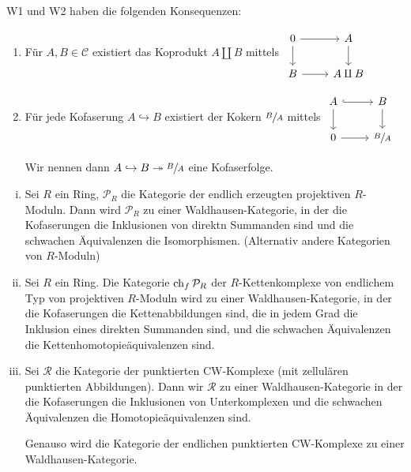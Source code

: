 \begin{bemerkung}
	W1 und W2 haben die folgenden Konsequenzen:
	\begin{enumerate}[1)]
		\item Für $A,B \in \mathcal{C}$ existiert das Koprodukt $A \amalg B$ mittels
		\(
			\begin{tikzcd}
				0 \rar \dar & A \dar \\
				B \rar & A \amalg B
			\end{tikzcd}
		\)
		\item Für jede Kofaserung $A \hookrightarrow B$ existiert der Kokern $\sfrac{B}{A}$ mittels
		\(
			\begin{tikzcd}
				A \rar[hook] \dar & B \dar \\
				0 \rar & \sfrac{B}{A}
			\end{tikzcd}
		\)
		
		Wir nennen dann $A \hookrightarrow B \twoheadrightarrow \sfrac{B}{A}$ eine Kofaserfolge.
	\end{enumerate}
\end{bemerkung}

\begin{beispiel}
	\leavevmode
	\begin{enumerate}[(i)]
		\item Sei $R$ ein Ring, $\mathcal{P}_R$ die Kategorie der endlich erzeugten projektiven $R$-Moduln.
		Dann wird $\mathcal{P}_R$ zu einer Waldhausen-Kategorie, in der die Kofaserungen die Inklusionen von direktn Summanden sind und die schwachen Äquivalenzen die Isomorphismen. (Alternativ andere Kategorien von $R$-Moduln)
		\item Sei $R$ ein Ring.
		Die Kategorie $\operatorname{ch}_f \mathcal{P}_R$ der $R$-Kettenkomplexe von endlichem Typ von projektiven $R$-Moduln wird zu einer Waldhausen-Kategorie, in der die Kofaserungen die Kettenabbildungen sind, die in jedem Grad die Inklusion eines direkten Summanden sind, und die schwachen Äquivalenzen die Kettenhomotopieäquivalenzen sind. 
		\item Sei $\mathcal{R}$ die Kategorie der punktierten CW-Komplexe (mit zellulären punktierten Abbildungen).
		Dann wir $\mathcal{R}$ zu einer Waldhausen-Kategorie in der die Kofaserungen die Inklusionen von Unterkomplexen und die schwachen Äquivalenzen die Homotopieäquivalenzen sind.
		
		Genauso wird die Kategorie der endlichen punktierten CW-Komplexe zu einer Waldhausen-Kategorie.
	\end{enumerate}
\end{beispiel}

